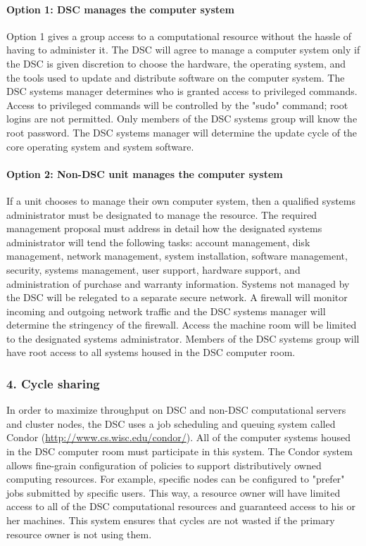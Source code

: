 \documentclass[12pt,a4paper]{article}
\begin{document}
\paragraph{Option 1: DSC manages the computer system}
Option 1 gives a group access to a computational resource without the hassle of having to administer it. The DSC will agree to manage a computer system only if the DSC is given discretion to choose the hardware, the operating system, and the tools used to update and distribute software on the computer system. The DSC systems manager determines who is granted access to privileged commands. Access to privileged commands will be controlled by the "sudo" command; root logins are not permitted. Only members of the DSC systems group will know the root password. The DSC systems manager will determine the update cycle of the core operating system and system software.

\paragraph{Option 2: Non-DSC unit manages the computer system}
If a unit chooses to manage their own computer system, then a qualified systems administrator must be designated to manage the resource. The required management proposal must address in detail how the designated systems administrator will tend the following tasks: account management, disk management, network management, system installation, software management, security, systems management, user support, hardware support, and administration of purchase and warranty information. Systems not managed by the DSC will be relegated to a separate secure network. A firewall will monitor incoming and outgoing network traffic and the DSC systems manager will determine the stringency of the firewall. Access the machine room will be limited to the designated systems administrator. Members of the DSC systems group will have root access to all systems housed in the DSC computer room.

\subsubsection*{4. Cycle sharing}
In order to maximize throughput on DSC and non-DSC computational servers and cluster nodes, the DSC uses a job scheduling and queuing system called Condor (\url{http://www.cs.wisc.edu/condor/}). All of the computer systems housed in the DSC computer room must participate in this system. The Condor system allows fine-grain configuration of policies to support distributively owned computing resources. For example, specific nodes can be configured to "prefer" jobs submitted by specific users. This way, a resource owner will have limited access to all of the DSC computational resources and guaranteed access to his or her machines. This system ensures that cycles are not wasted if the primary resource owner is not using them.
\end{document}
